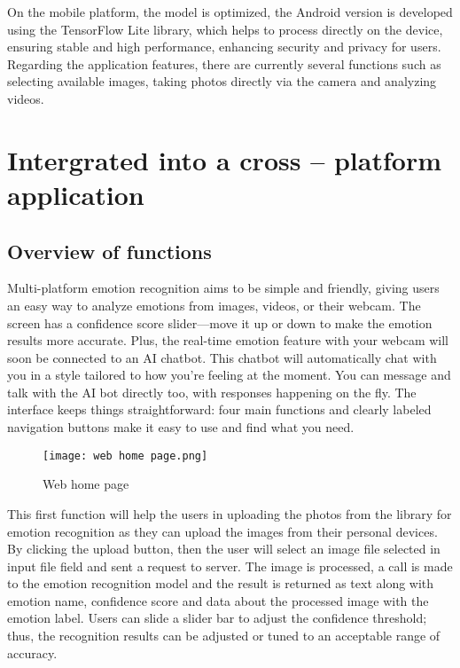 \documentclass[a4paper,13pt]{report}
\begin{document}
On the mobile platform, the model is optimized, the Android version is developed using the TensorFlow Lite library, which helps to process directly on the device, ensuring stable and high performance, enhancing security and privacy for users. Regarding the application features, there are currently several functions such as selecting available images, taking photos directly via the camera and analyzing videos.

\section{Intergrated into a cross – platform application }
\subsection{Overview of functions}
Multi-platform emotion recognition aims to be simple and friendly, giving users an easy way to analyze emotions from images, videos, or their webcam. The screen has a confidence score slider—move it up or down to make the emotion results more accurate. Plus, the real-time emotion feature with your webcam will soon be connected to an AI chatbot. This chatbot will automatically chat with you in a style tailored to how you’re feeling at the moment. You can message and talk with the AI bot directly too, with responses happening on the fly. The interface keeps things straightforward: four main functions and clearly labeled navigation buttons make it easy to use and find what you need.\\

\begin{figure}[H]
  \centering
  \texttt{[image: web home page.png]}
  \caption{Web home page}
  \label{fig:method}
\end{figure}


This first function will help the users in uploading the photos from the library for emotion recognition as they can upload the images from their personal devices. By clicking the upload button, then the user will select an image file selected in input file field and sent a request to server. The image is processed, a call is made to the emotion recognition model and the result is returned as text along with emotion name, confidence score and data about the processed image with the emotion label. Users can slide a slider bar to adjust the confidence threshold; thus, the recognition results can be adjusted or tuned to an acceptable range of accuracy.
\end{document}
